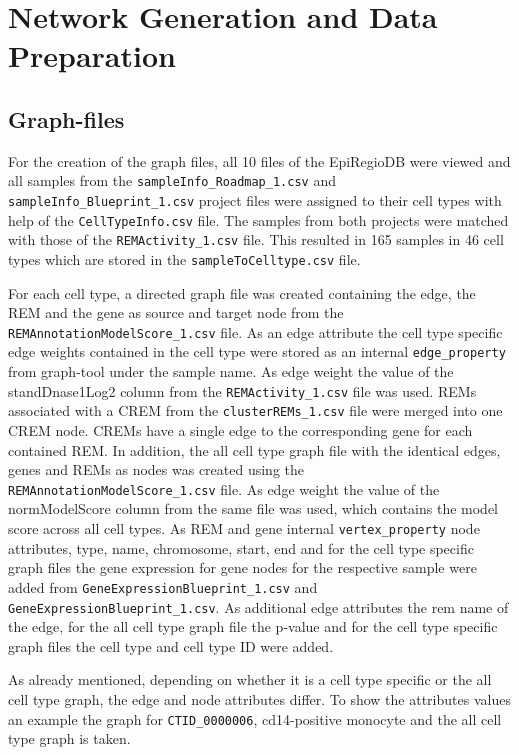 \documentclass[pdftex,12pt,a4paper]{report}
\begin{document}
\section{Network Generation and Data Preparation}
\subsection{Graph-files}
\label{graphfiles}
For the creation of the graph files, all 10 files of the EpiRegioDB were viewed and all samples from the \texttt{sampleInfo\_Roadmap\_1.csv} and \texttt{sampleInfo\_Blueprint\_1.csv} project files were assigned to their cell types with help of the \texttt{CellTypeInfo.csv} file. The samples from both projects were matched with those of the \texttt{REMActivity\_1.csv} file. This resulted in 165 samples in 46 cell types which are stored in the \texttt{sampleToCelltype.csv} file. 

For each cell type, a directed graph file was created containing the edge, the REM and the gene as source and target node from the \texttt{REMAnnotationModelScore\_1.csv} file. As an edge attribute the cell type specific edge weights contained in the cell type were stored as an internal \texttt{edge\_property} from graph-tool under the sample name. As edge weight the value of the standDnase1Log2 column from the \texttt{REMActivity\_1.csv} file was used. REMs associated with a CREM from the \texttt{clusterREMs\_1.csv} file were merged into one CREM node. CREMs have a single edge to the corresponding gene for each contained REM. 
In addition, the all cell type graph file with the identical edges, genes and REMs as nodes was created using the \texttt{REMAnnotationModelScore\_1.csv} file. As edge weight the value of the normModelScore column from the same file was used, which contains the model score across all cell types.
As REM and gene internal \texttt{vertex\_property} node attributes, type, name, chromosome, start, end and for the cell type specific graph files the gene expression for gene nodes for the respective sample were added from \texttt{GeneExpressionBlueprint\_1.csv} and \texttt{GeneExpressionBlueprint\_1.csv}.
As additional edge attributes the rem name of the edge, for the all cell type graph file the p-value and for the cell type specific graph files the cell type and cell type ID were added. 

As already mentioned, depending on whether it is a cell type specific or the all cell type graph, the edge and node attributes differ. To show the attributes values an example the graph for \texttt{CTID\_0000006}, cd14-positive monocyte and the all cell type graph is taken. 
\end{document}
